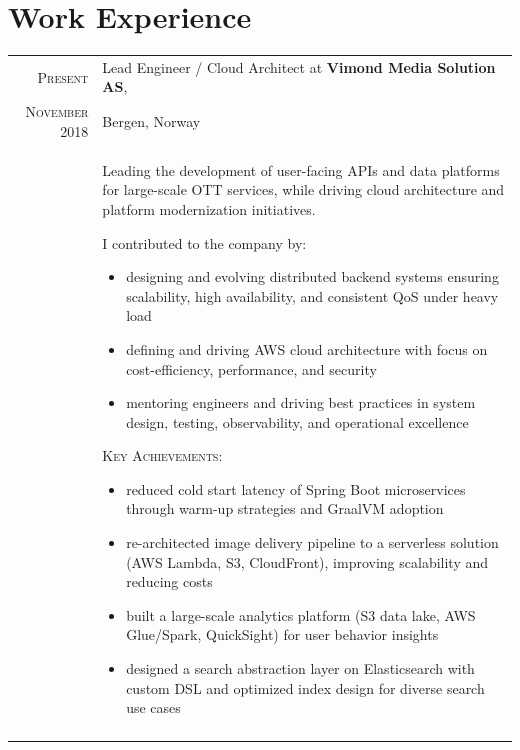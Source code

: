 \documentclass[a4paper,10pt]{article} %
\begin{document}
\section{Work Experience}

\begin{longtable}{r|p{11cm}}



\textsc{Present} & Lead Engineer / Cloud Architect at \textbf{Vimond Media Solution AS},
\\ \textsc{November} 2018 & Bergen, Norway \\
& \textsc Leading the development of user-facing APIs and data platforms for large-scale OTT services, while driving cloud architecture and platform modernization initiatives.

I contributed to the company by:
\begin{itemize}
\item designing and evolving distributed backend systems ensuring scalability, high availability, and consistent QoS under heavy load
\item defining and driving AWS cloud architecture with focus on cost-efficiency, performance, and security
\item mentoring engineers and driving best practices in system design, testing, observability, and operational excellence
\end{itemize}

\textsc{Key Achievements:}
\begin{itemize}
\item reduced cold start latency of Spring Boot microservices through warm-up strategies and GraalVM adoption
\item re-architected image delivery pipeline to a serverless solution (AWS Lambda, S3, CloudFront), improving scalability and reducing costs
\item built a large-scale analytics platform (S3 data lake, AWS Glue/Spark, QuickSight) for user behavior insights
\item designed a search abstraction layer on Elasticsearch with custom DSL and optimized index design for diverse search use cases
\end{itemize} \\
\multicolumn{2}{c}{} \\


\end{longtable}
\end{document}
